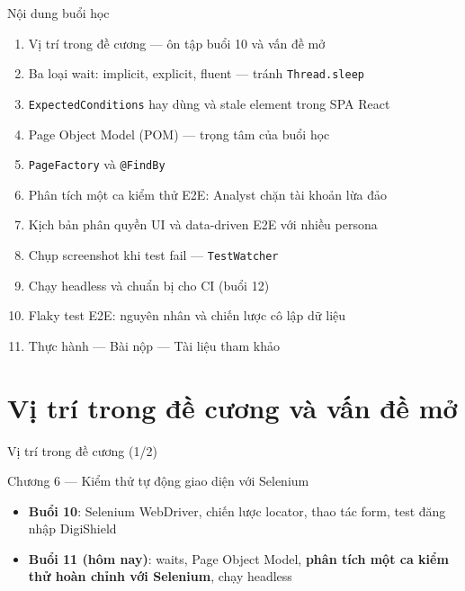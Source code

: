 \documentclass[aspectratio=169,12pt]{beamer}
\begin{document}
\begin{frame}{Nội dung buổi học}
  \begin{enumerate}
    \item Vị trí trong đề cương --- ôn tập buổi 10 và vấn đề mở
    \item Ba loại wait: implicit, explicit, fluent --- tránh \texttt{Thread.sleep}
    \item \texttt{ExpectedConditions} hay dùng và stale element trong SPA React
    \item Page Object Model (POM) --- trọng tâm của buổi học
    \item \texttt{PageFactory} và \texttt{@FindBy}
    \item Phân tích một ca kiểm thử E2E: Analyst chặn tài khoản lừa đảo
    \item Kịch bản phân quyền UI và data-driven E2E với nhiều persona
    \item Chụp screenshot khi test fail --- \texttt{TestWatcher}
    \item Chạy headless và chuẩn bị cho CI (buổi 12)
    \item Flaky test E2E: nguyên nhân và chiến lược cô lập dữ liệu
    \item Thực hành --- Bài nộp --- Tài liệu tham khảo
  \end{enumerate}
\end{frame}

\section{Vị trí trong đề cương và vấn đề mở}

\begin{frame}{Vị trí trong đề cương (1/2)}
  \begin{block}{Chương 6 --- Kiểm thử tự động giao diện với Selenium}
    \begin{itemize}
      \item \textbf{Buổi 10}: Selenium WebDriver, chiến lược locator,
            thao tác form, test đăng nhập DigiShield
      \item \textbf{Buổi 11 (hôm nay)}: waits, Page Object Model,
            \textbf{phân tích một ca kiểm thử hoàn chỉnh với Selenium},
            chạy headless
    \end{itemize}
  \end{block}
\end{frame}
\end{document}
